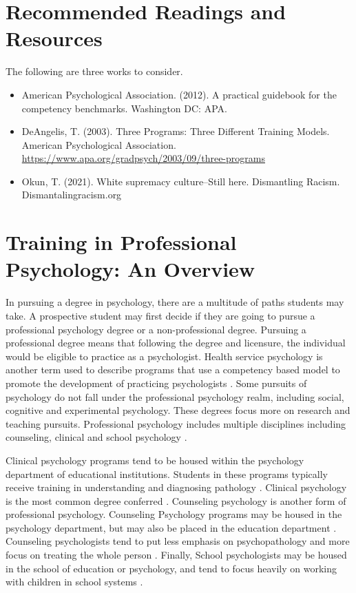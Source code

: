 \documentclass[
  11pt,
]{book}
\providecommand{\tightlist}{%
  \setlength{\itemsep}{0pt}\setlength{\parskip}{0pt}}
\begin{document}
\section{Recommended Readings and Resources}\label{recommended-readings-and-resources-1}

The following are three works to consider.

\begin{itemize}
\tightlist
\item
  American Psychological Association. (2012). A practical guidebook for the competency benchmarks. Washington DC: APA.
\item
  DeAngelis, T. (2003). Three Programs: Three Different Training Models. American Psychological Association. \url{https://www.apa.org/gradpsych/2003/09/three-programs}
\item
  Okun, T. (2021). White supremacy culture--Still here. Dismantling Racism. Dismantalingracism.org
\end{itemize}

\section{Training in Professional Psychology: An Overview}\label{training-in-professional-psychology-an-overview}

In pursuing a degree in psychology, there are a multitude of paths students may take. A prospective student may first decide if they are going to pursue a professional psychology degree or a non-professional degree. Pursuing a professional degree means that following the degree and licensure, the individual would be eligible to practice as a psychologist. Health service psychology is another term used to describe programs that use a competency based model to promote the development of practicing psychologists \citep{noauthor_what_nodate}. Some pursuits of psychology do not fall under the professional psychology realm, including social, cognitive and experimental psychology. These degrees focus more on research and teaching pursuits. Professional psychology includes multiple disciplines including counseling, clinical and school psychology \citep{noauthor_types_nodate}.

Clinical psychology programs tend to be housed within the psychology department of educational institutions. Students in these programs typically receive training in understanding and diagnosing pathology \citep{noauthor_counseling_nodate}. Clinical psychology is the most common degree conferred \citep{noauthor_types_nodate}. Counseling psychology is another form of professional psychology. Counseling Psychology programs may be housed in the psychology department, but may also be placed in the education department \citep{noauthor_types_nodate}. Counseling psychologists tend to put less emphasis on psychopathology and more focus on treating the whole person \citep{noauthor_counseling_nodate}. Finally, School psychologists may be housed in the school of education or psychology, and tend to focus heavily on working with children in school systems \citep{noauthor_types_nodate}.
\end{document}
